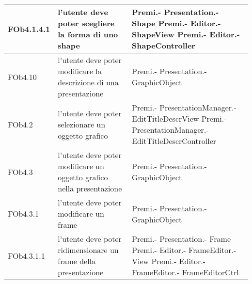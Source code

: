 \begin{longtable}{|l|p{5cm}|p{7cm}|}
\hline
FOb4.1.4.1 & l'utente deve poter scegliere la forma di uno shape & Premi.- \linebreak Presentation.- \linebreak Shape \linebreak Premi.- \linebreak Editor.- \linebreak ShapeView \linebreak Premi.- \linebreak Editor.- \linebreak ShapeController \linebreak \\
\hline
FOb4.10 & l'utente deve poter modificare la descrizione di una presentazione & Premi.- \linebreak Presentation.- \linebreak GraphicObject \linebreak \\
\hline
FOb4.2 & l'utente deve poter selezionare un oggetto grafico & Premi.- \linebreak PresentationManager.- \linebreak EditTitleDescrView \linebreak Premi.- \linebreak PresentationManager.- \linebreak EditTitleDescrController \linebreak \\
\hline
FOb4.3 & l'utente deve poter modificare un oggetto grafico nella presentazione & Premi.- \linebreak Presentation.- \linebreak GraphicObject \linebreak \\
\hline
FOb4.3.1 & l'utente deve poter modificare un frame & Premi.- \linebreak Presentation.- \linebreak GraphicObject \linebreak \\
\hline
FOb4.3.1.1 & l'utente deve poter ridimensionare un frame della presentazione & Premi.- \linebreak Presentation.- \linebreak Frame \linebreak Premi.- \linebreak Editor.- \linebreak FrameEditor.- \linebreak View \linebreak Premi.- \linebreak Editor.- \linebreak FrameEditor.- \linebreak FrameEditorCtrl \linebreak \\

\end{longtable}
